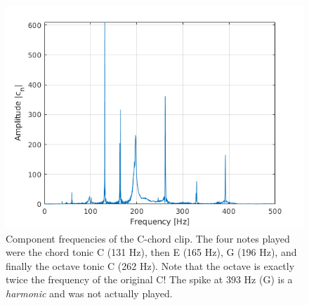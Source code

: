 \documentclass[12pt]{article}
\begin{document}
\begin{figure}[h]
  \centering
  \includegraphics[width=\textwidth]{Fourier/woop}
  \caption{Component frequencies of the C-chord clip. The four notes played were the chord tonic C (131 Hz), then E (165 Hz), G (196 Hz), and finally the octave tonic C (262 Hz). Note that the octave is exactly twice the frequency of the original C! The spike at 393 Hz (G) is a \textit{harmonic} and was not actually played.}\label{cchord}
\end{figure}
\end{document}
